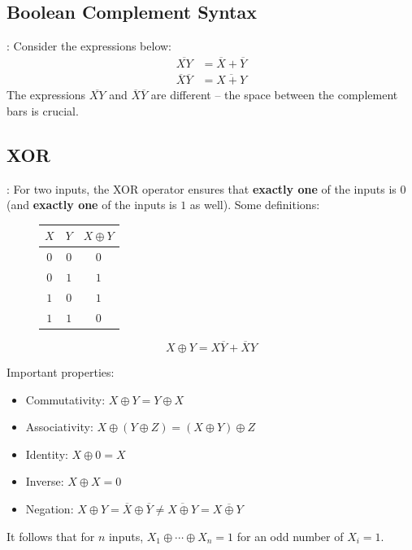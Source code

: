\documentclass{../slides}
\begin{document}
\subsection{Boolean Complement Syntax}
\begin{frame}{\secname: \subsecname}
    Consider the expressions below:
    \begin{align*}
        \overbar{XY} &= \overbar{X} + \overbar{Y}\\
        \overbar{X}\overbar{Y} &= \overbar{X + Y}
    \end{align*}
    The expressions $\overbar{XY}$ and $\overbar{X}\overbar{Y}$ are different -- the space between the complement bars is crucial.\\
\end{frame}

\subsection{XOR}
\begin{frame}{\secname: \subsecname}
    For two inputs, the XOR operator ensures that \textbf{exactly one} of the inputs is $0$ (and \textbf{exactly one} of the inputs is $1$ as well). Some definitions:
    \begin{multicols}{2}
    \begin{figure}[H]
        \centering
        \begin{table}[H]
        \begin{tabular}{|c|c|c|}
        \hline
        $X$ & $Y$ & $X\oplus Y$ \\ \hline\hline
        $0$ & $0$ & $0$ \\ \hline
        $0$ & $1$ & $1$ \\ \hline
        $1$ & $0$ & $1$ \\ \hline
        $1$ & $1$ & $0$ \\ \hline
        \end{tabular}
        \end{table}
    \end{figure}
    $$X\oplus Y = X\overbar{Y} + \overbar{X}Y$$
    \end{multicols}
    Important properties:
    \begin{itemize}
        \item Commutativity: $X\oplus Y = Y\oplus X$
        \item Associativity: $X\oplus (Y\oplus Z) = (X\oplus Y) \oplus Z$
        \item Identity: $X\oplus 0 = X$
        \item Inverse: $X\oplus X = 0$
        \item Negation: $X\oplus Y = \overbar{X} \oplus \overbar{Y} \neq \overbar{X\oplus Y} = X\overbar{\oplus}Y$
    \end{itemize}
    It follows that for $n$ inputs, $X_1\oplus \cdots \oplus X_n = 1$ for an odd number of $X_i = 1$.
\end{frame}
\end{document}
